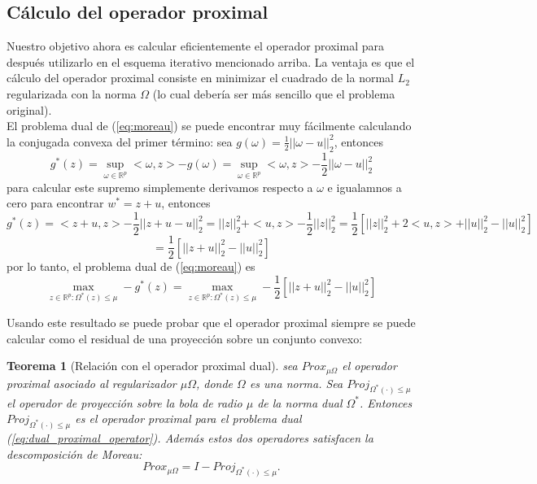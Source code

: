 \documentclass[12pt,draftcls, onecolumn, letterpaper,compsoc]{IEEEtran}
\newtheorem{theorem}{\textbf{Teorema}}
\begin{document}
\subsection{C\'{a}lculo del operador proximal}
Nuestro objetivo ahora es calcular eficientemente el operador proximal para despu\'{e}s utilizarlo en el esquema iterativo mencionado arriba. La ventaja es que el c\'{a}lculo del operador proximal consiste en minimizar el cuadrado de la normal $L_2$ regularizada con la norma $\Omega$ (lo cual deber\'{i}a ser m\'{a}s sencillo que el problema original).\\

El problema dual de (\ref{eq:moreau}) se puede encontrar muy f\'{a}cilmente calculando la conjugada convexa del primer t\'{e}rmino: sea $g(\omega) = \frac{1}{2}||\omega - u ||_2^2$, entonces
\begin{displaymath}
    g^{*}(z) = \sup_{\omega \in \mathbb{R}^{p}} <\omega, z> - g(\omega) = \sup_{\omega \in \mathbb{R}^{p}} <\omega, z> - \frac{1}{2}||\omega - u ||_2^2
\end{displaymath}
para calcular este supremo simplemente derivamos respecto a $\omega$ e igualamnos a cero para encontrar $w^{*} = z+u$, entonces
\begin{displaymath}
    g^{*}(z) = <z+u, z> - \frac{1}{2}||z+u-u||_2^2 = ||z||_2^{2} + <u,z> - \frac{1}{2}||z||_2^2 = \frac{1}{2}\left[ ||z||_2^2 + 2<u,z> + ||u||_2^2 - ||u||_2^2\right]
\end{displaymath}
\begin{displaymath}
   =\frac{1}{2}\left[ ||z+u||_2^2  - ||u||_2^2\right]
\end{displaymath}
por lo tanto, el problema dual de (\ref{eq:moreau}) es
\begin{equation}\label{eq:dual_proximal_operator}
   \max_{z\in \mathbb{R}^{p}: \Omega^{*}(z)\leq \mu} -g^{*}(z) = \max_{z\in \mathbb{R}^{p}: \Omega^{*}(z)\leq \mu} -\frac{1}{2}\left[ ||z+u||_2^2 - ||u||_2^2\right]
\end{equation}

Usando este resultado se puede probar que el operador proximal siempre se puede calcular como el residual de una proyecci\'{o}n sobre un conjunto convexo:
\begin{theorem}[Relaci\'{o}n con el operador proximal dual]
    sea $Prox_{\mu\Omega}$ el operador proximal asociado al regularizador $\mu\Omega$, donde $\Omega$ es una norma. Sea $Proj_{\Omega^{*}(\cdot)\leq\mu}$ el operador de proyecci\'{o}n sobre la bola de radio $\mu$ de la norma dual $\Omega^{*}$. Entonces $Proj_{\Omega^{*}(\cdot)\leq\mu}$ es el operador proximal para el problema dual (\ref{eq:dual_proximal_operator}). Adem\'{a}s estos dos operadores satisfacen la descomposici\'{o}n de Moreau:
    \begin{equation}
        Prox_{\mu\Omega} = I - Proj_{\Omega^{*}(\cdot)\leq\mu}.
    \end{equation}
\end{theorem}
\end{document}
